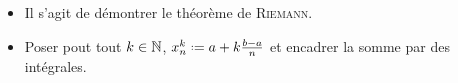 \begin{itemize}
    \item Il s'agit de démontrer le théorème de \textsc{Riemann}. 
    \item Poser pout tout $k \in \mathbb{N}$, $x_n^k \defeq a+k\frac{b-a}{n}$ et encadrer la somme par des intégrales. 
\end{itemize}